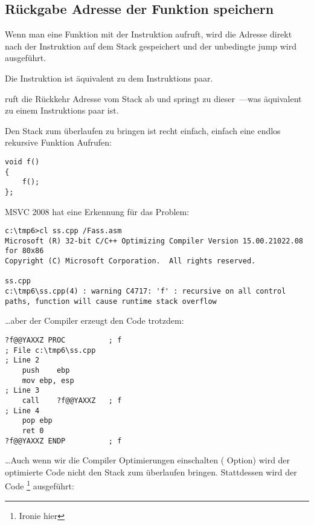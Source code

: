 \subsection{Rückgabe Adresse der Funktion speichern}


Wenn man eine Funktion mit der \CALL Instruktion aufruft, wird die Adresse direkt nach der
\CALL Instruktion auf dem Stack gespeichert und der unbedingte jump wird ausgeführt.

Die \CALL Instruktion ist äquivalent zu dem  Instruktions paar.

\RET ruft die Rückkehr Adresse vom Stack ab und springt zu dieser~---was äquivalent zu einem  Instruktions
paar ist.

\myindex{\Stack!\MLStackOverflow}
\myindex{\Recursion}

Den Stack zum überlaufen zu bringen ist recht einfach, einfach eine 
endlos rekursive Funktion Aufrufen:


\begin{lstlisting}[style=customc]
void f()
{
	f();
};
\end{lstlisting}


MSVC 2008 hat eine Erkennung für das Problem:


\begin{lstlisting}
c:\tmp6>cl ss.cpp /Fass.asm
Microsoft (R) 32-bit C/C++ Optimizing Compiler Version 15.00.21022.08 for 80x86
Copyright (C) Microsoft Corporation.  All rights reserved.

ss.cpp
c:\tmp6\ss.cpp(4) : warning C4717: 'f' : recursive on all control paths, function will cause runtime stack overflow
\end{lstlisting}

\dots aber der Compiler erzeugt den Code trotzdem:

\begin{lstlisting}[style=customasmx86]
?f@@YAXXZ PROC			; f
; File c:\tmp6\ss.cpp
; Line 2
	push	ebp
	mov	ebp, esp
; Line 3
	call	?f@@YAXXZ	; f
; Line 4
	pop	ebp
	ret	0
?f@@YAXXZ ENDP			; f
\end{lstlisting}

\dots Auch wenn wir die Compiler Optimierungen einschalten ( Option) wird der optimierte Code nicht
den Stack zum überlaufen bringen. Stattdessen wird der Code \footnote{Ironie hier} ausgeführt: 

